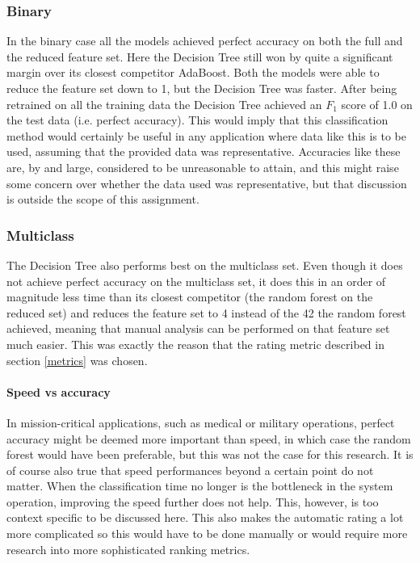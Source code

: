 \documentclass[british]{article}
\begin{document}
	\subsubsection{Binary}  In the binary case all the models achieved perfect accuracy on both the full and the reduced feature set. Here the Decision Tree still won by quite a significant margin over its closest competitor AdaBoost. Both the models were able to reduce the feature set down to 1, but the Decision Tree was faster. After being retrained on all the training data the Decision Tree achieved an $F_1$ score of 1.0 on the test data (i.e. perfect accuracy). This would imply that this classification method would certainly be useful in any application where data like this is to be used, assuming that the provided data was representative. Accuracies like these are, by and large, considered to be unreasonable to attain, and this might raise some concern over whether the data used was representative, but that discussion is outside the scope of this assignment.  
	
	\subsubsection{Multiclass} The Decision Tree also performs best on the multiclass set. Even though it does not achieve perfect accuracy on the multiclass set, it does this in an order of magnitude less time than its closest competitor (the random forest on the reduced set) and reduces the feature set to 4 instead of the 42 the random forest achieved, meaning that manual analysis can be performed on that feature set much easier. This was exactly the reason that the rating metric described in section \ref{metrics} was chosen.
	
	\paragraph{Speed vs accuracy}  In mission-critical applications, such as medical or military operations, perfect accuracy might be deemed more important than speed, in which case the random forest would have been preferable, but this was not the case for this research. It is of course also true that speed performances beyond a certain point do not matter. When the classification time no longer is the bottleneck in the system operation, improving the speed further does not help. This, however, is too context specific to be discussed here. This also makes the automatic rating a lot more complicated so this would have to be done manually or would require more research into more sophisticated ranking metrics.  
	
\end{document}
